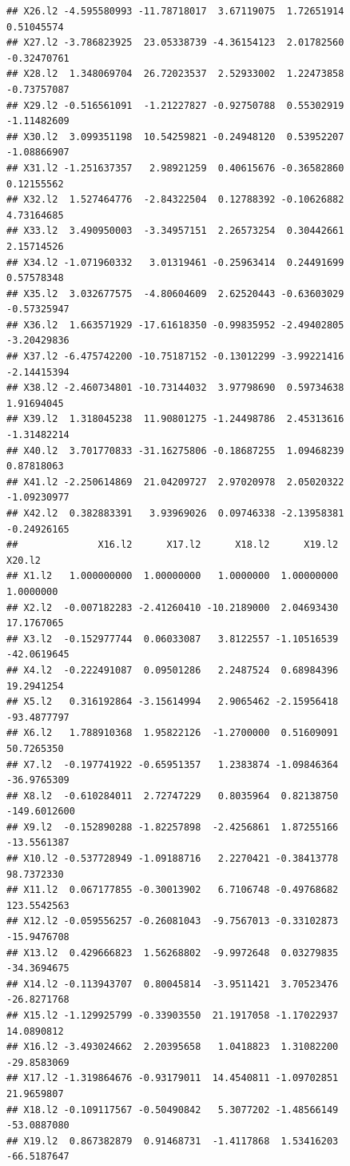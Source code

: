 \documentclass[]{article}
\begin{document}
\begin{verbatim}
## X26.l2 -4.595580993 -11.78718017  3.67119075  1.72651914  0.51045574
## X27.l2 -3.786823925  23.05338739 -4.36154123  2.01782560 -0.32470761
## X28.l2  1.348069704  26.72023537  2.52933002  1.22473858 -0.73757087
## X29.l2 -0.516561091  -1.21227827 -0.92750788  0.55302919 -1.11482609
## X30.l2  3.099351198  10.54259821 -0.24948120  0.53952207 -1.08866907
## X31.l2 -1.251637357   2.98921259  0.40615676 -0.36582860  0.12155562
## X32.l2  1.527464776  -2.84322504  0.12788392 -0.10626882  4.73164685
## X33.l2  3.490950003  -3.34957151  2.26573254  0.30442661  2.15714526
## X34.l2 -1.071960332   3.01319461 -0.25963414  0.24491699  0.57578348
## X35.l2  3.032677575  -4.80604609  2.62520443 -0.63603029 -0.57325947
## X36.l2  1.663571929 -17.61618350 -0.99835952 -2.49402805 -3.20429836
## X37.l2 -6.475742200 -10.75187152 -0.13012299 -3.99221416 -2.14415394
## X38.l2 -2.460734801 -10.73144032  3.97798690  0.59734638  1.91694045
## X39.l2  1.318045238  11.90801275 -1.24498786  2.45313616 -1.31482214
## X40.l2  3.701770833 -31.16275806 -0.18687255  1.09468239  0.87818063
## X41.l2 -2.250614869  21.04209727  2.97020978  2.05020322 -1.09230977
## X42.l2  0.382883391   3.93969026  0.09746338 -2.13958381 -0.24926165
##              X16.l2      X17.l2      X18.l2      X19.l2       X20.l2
## X1.l2   1.000000000  1.00000000   1.0000000  1.00000000    1.0000000
## X2.l2  -0.007182283 -2.41260410 -10.2189000  2.04693430   17.1767065
## X3.l2  -0.152977744  0.06033087   3.8122557 -1.10516539  -42.0619645
## X4.l2  -0.222491087  0.09501286   2.2487524  0.68984396   19.2941254
## X5.l2   0.316192864 -3.15614994   2.9065462 -2.15956418  -93.4877797
## X6.l2   1.788910368  1.95822126  -1.2700000  0.51609091   50.7265350
## X7.l2  -0.197741922 -0.65951357   1.2383874 -1.09846364  -36.9765309
## X8.l2  -0.610284011  2.72747229   0.8035964  0.82138750 -149.6012600
## X9.l2  -0.152890288 -1.82257898  -2.4256861  1.87255166  -13.5561387
## X10.l2 -0.537728949 -1.09188716   2.2270421 -0.38413778   98.7372330
## X11.l2  0.067177855 -0.30013902   6.7106748 -0.49768682  123.5542563
## X12.l2 -0.059556257 -0.26081043  -9.7567013 -0.33102873  -15.9476708
## X13.l2  0.429666823  1.56268802  -9.9972648  0.03279835  -34.3694675
## X14.l2 -0.113943707  0.80045814  -3.9511421  3.70523476  -26.8271768
## X15.l2 -1.129925799 -0.33903550  21.1917058 -1.17022937   14.0890812
## X16.l2 -3.493024662  2.20395658   1.0418823  1.31082200  -29.8583069
## X17.l2 -1.319864676 -0.93179011  14.4540811 -1.09702851   21.9659807
## X18.l2 -0.109117567 -0.50490842   5.3077202 -1.48566149  -53.0887080
## X19.l2  0.867382879  0.91468731  -1.4117868  1.53416203  -66.5187647

\end{verbatim}
\end{document}
